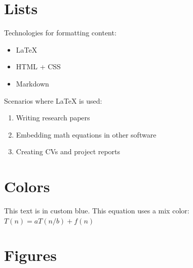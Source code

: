 ﻿\documentclass[12pt, a4paper]{article}
\begin{document}
\tableofcontents

\section{Lists}

Technologies for formatting content:
\begin{itemize}
    \item \LaTeX{}
    \item HTML + CSS
    \item Markdown
\end{itemize}

Scenarios where \LaTeX{} is used:
\begin{enumerate}
    \item Writing research papers
    \item Embedding math equations in other software
    \item Creating CVs and project reports
\end{enumerate}

\section{Colors}

This text is in {\color{myblue} custom blue}.
This equation uses a mix color: \textcolor{mymix}{$T(n) = aT(n/b) + f(n)$}

\section{Figures}


\end{document}
